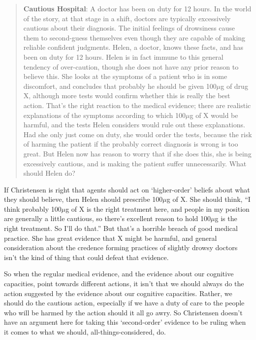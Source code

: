 \begin{quote} \textbf{Cautious Hospital}: A doctor has been on duty for 12 hours. In the world of the story, at that stage in a shift, doctors are typically excessively cautious about their diagnosis. The initial feelings of drowsiness cause them to second-guess themselves even though they are capable of making reliable confident judgments. Helen, a doctor, knows these facts, and has been on duty for 12 hours. Helen is in fact immune to this general tendency of over-caution, though she does not have any prior reason to believe this. She looks at the symptoms of a patient who is in some discomfort, and concludes that probably he should be given 100$\mu$g of drug X, although more tests would confirm whether this is really the best action. That's the right reaction to the medical evidence; there are realistic explanations of the symptoms according to which 100$\mu$g of X would be harmful, and the tests Helen considers would rule out these explanations. Had she only just come on duty, she would order the tests, because the risk of harming the patient if the probably correct diagnosis is wrong is too great. But Helen now has reason to worry that if she does this, she is being excessively cautious, and is making the patient suffer unnecessarily. What should Helen do? \end{quote}

\noindent If Christensen is right that agents should act on `higher-order' beliefs about what they should believe, then Helen should prescribe 100$\mu$g of X. She should think, ``I think probably 100$\mu$g of X is the right treatment here, and people in my position are generally a little cautious, so there's excellent reason to hold 100$\mu$g is the right treatment. So I'll do that.'' But that's a horrible breach of good medical practice. She has great evidence that X might be harmful, and general consideration about the credence forming practices of slightly drowsy doctors isn't the kind of thing that could defeat that evidence.

So when the regular medical evidence, and the evidence about our cognitive capacities, point towards different actions, it isn't that we should always do the action suggested by the evidence about our cognitive capacities. Rather, we should do the cautious action, especially if we have a duty of care to the people who will be harmed by the action should it all go awry. So Christensen doesn't have an argument here for taking this `second-order' evidence to be ruling when it comes to what we should, all-things-considered, do.

